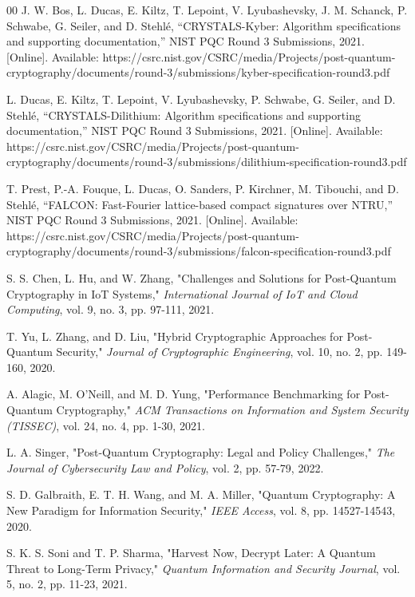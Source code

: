 \documentclass[conference]{IEEEtran}
\begin{document}
\begin{thebibliography}{00}
J. W. Bos, L. Ducas, E. Kiltz, T. Lepoint, V. Lyubashevsky, J. M. Schanck, P. Schwabe, G. Seiler, and D. Stehlé, ``CRYSTALS-Kyber: Algorithm specifications and supporting documentation,'' NIST PQC Round 3 Submissions, 2021. [Online]. Available: https://csrc.nist.gov/CSRC/media/Projects/post-quantum-cryptography/documents/round-3/submissions/kyber-specification-round3.pdf

L. Ducas, E. Kiltz, T. Lepoint, V. Lyubashevsky, P. Schwabe, G. Seiler, and D. Stehlé, ``CRYSTALS-Dilithium: Algorithm specifications and supporting documentation,'' NIST PQC Round 3 Submissions, 2021. [Online]. Available: https://csrc.nist.gov/CSRC/media/Projects/post-quantum-cryptography/documents/round-3/submissions/dilithium-specification-round3.pdf

T. Prest, P.-A. Fouque, L. Ducas, O. Sanders, P. Kirchner, M. Tibouchi, and D. Stehlé, ``FALCON: Fast-Fourier lattice-based compact signatures over NTRU,'' NIST PQC Round 3 Submissions, 2021. [Online]. Available: https://csrc.nist.gov/CSRC/media/Projects/post-quantum-cryptography/documents/round-3/submissions/falcon-specification-round3.pdf

S. S. Chen, L. Hu, and W. Zhang, "Challenges and Solutions for Post-Quantum Cryptography in IoT Systems," \textit{International Journal of IoT and Cloud Computing}, vol. 9, no. 3, pp. 97-111, 2021.

 T. Yu, L. Zhang, and D. Liu, "Hybrid Cryptographic Approaches for Post-Quantum Security," \textit{Journal of Cryptographic Engineering}, vol. 10, no. 2, pp. 149-160, 2020.

 A. Alagic, M. O’Neill, and M. D. Yung, "Performance Benchmarking for Post-Quantum Cryptography," \textit{ACM Transactions on Information and System Security (TISSEC)}, vol. 24, no. 4, pp. 1-30, 2021.

 L. A. Singer, "Post-Quantum Cryptography: Legal and Policy Challenges," \textit{The Journal of Cybersecurity Law and Policy}, vol. 2, pp. 57-79, 2022.

 S. D. Galbraith, E. T. H. Wang, and M. A. Miller, "Quantum Cryptography: A New Paradigm for Information Security," \textit{IEEE Access}, vol. 8, pp. 14527-14543, 2020.

 S. K. S. Soni and T. P. Sharma, "Harvest Now, Decrypt Later: A Quantum Threat to Long-Term Privacy," \textit{Quantum Information and Security Journal}, vol. 5, no. 2, pp. 11-23, 2021.


\end{thebibliography}
\end{document}
